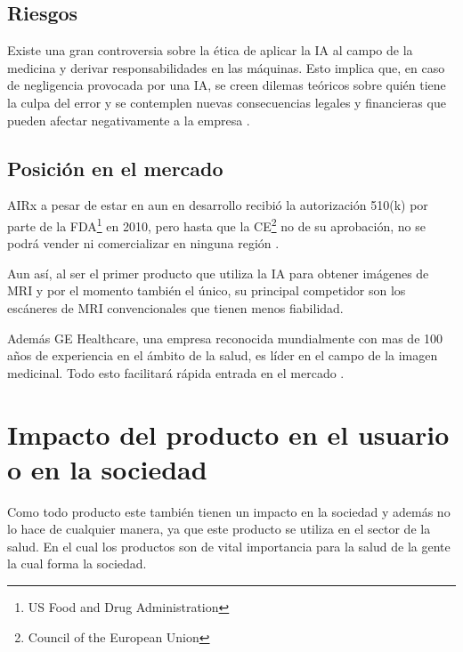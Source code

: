     \subsection{Riesgos}
    
    Existe una gran controversia sobre la ética de aplicar la IA al campo de la medicina y derivar responsabilidades en las máquinas. Esto implica que, en caso de negligencia provocada por una IA, se creen dilemas teóricos sobre quién tiene la culpa del error y se contemplen nuevas consecuencias legales y financieras que pueden afectar negativamente a la empresa \cite{healthitanalytics_arguing_2018}.
    
    
    \subsection{Posición en el mercado}
    
    AIRx a pesar de estar en aun en desarrollo recibió la autorización 510(k) por parte de la FDA\footnote{US Food and Drug Administration} en 2010, pero hasta que la CE\footnote{Council of the European Union} no de su aprobación, no se podrá vender ni comercializar en ninguna región \cite{noauthor_air_nodate,noauthor_ge_nodate-1}.
    
    Aun así, al ser el primer producto que utiliza la IA para obtener imágenes de MRI y por el momento también el único, su principal competidor son los escáneres de MRI convencionales que tienen menos fiabilidad. 
    
    Además GE Healthcare, una empresa reconocida mundialmente con mas de 100 años de experiencia en el ámbito de la salud, es líder en el campo de la imagen medicinal. Todo esto facilitará rápida entrada en el mercado \cite{noauthor_ge_nodate}.
    
\pagebreak
\section{Impacto del producto en el usuario o en la sociedad}
    
Como todo producto este también tienen un impacto en la sociedad y además no lo hace de cualquier manera, ya que este producto se utiliza en el sector de la salud. En el cual los productos son de vital importancia para la salud de la gente la cual forma la sociedad.

\cite{noauthor_how_nodate,noauthor_magnetic_nodate} 

